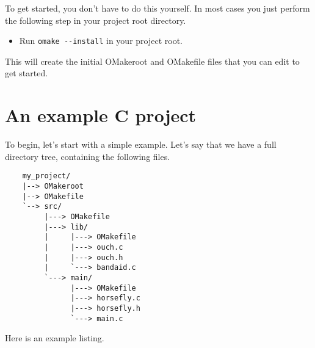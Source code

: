 To get started, you don't have to do this yourself.  In most cases you just perform the following
step in your project root directory.

\begin{itemize}
\item Run \verb+omake --install+ in your project root.
\end{itemize}

This will create the initial OMakeroot and OMakefile files that you can edit to get started.

\section{An example C project}

To begin, let's start with a simple example.  Let's say that we have a full directory tree,
containing the following files.

\begin{verbatim}
    my_project/
    |--> OMakeroot
    |--> OMakefile
    `--> src/
         |---> OMakefile
         |---> lib/
         |     |---> OMakefile
         |     |---> ouch.c
         |     |---> ouch.h
         |     `---> bandaid.c
         `---> main/
               |---> OMakefile
               |---> horsefly.c
               |---> horsefly.h
               `---> main.c
\end{verbatim}

Here is an example listing.

